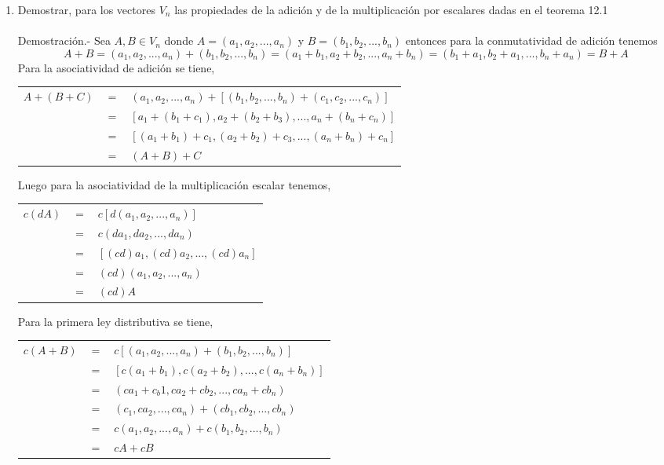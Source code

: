 \begin{enumerate}[\bfseries 1.]
\begin{enumerate}[\bfseries a)]
    \item Demostrar, para los vectores $V_n$ las propiedades de la adición y de la multiplicación por escalares dadas en el teorema 12.1\\\\
	Demostración.-\; Sea $A,B \in V_n$ donde $A=(a_1,a_2,...,a_n)$ y $B=(b_1,b_2,...,b_n)$ entonces para la conmutatividad de adición tenemos $$A+B=(a_1,a_2,...,a_n)+(b_1,b_2,...,b_n) = (a_1+b_1,a_2+b_2,...,a_n+b_n) = (b_1+a_1,b_2+a_1,...,b_n+a_n) = B+A$$
	Para la asociatividad de adición se tiene,
	\begin{center}
	    \begin{tabular}{rcl}
		$A+(B+C)$&$=$&$(a_1,a_2,...,a_n)+\left[(b_1,b_2,...,b_n)+(c_1,c_2,...,c_n)\right]$\\
		&$=$&$\left[a_1+(b_1+c_1),a_2+(b_2+b_3),...,a_n+(b_n+c_n)\right]$\\
		&$=$&$\left[(a_1+b_1)+c_1,(a_2+b_2)+c_3,...,(a_n+b_n)+c_n\right]$\\
		&$=$&$(A+B)+C$\\
	    \end{tabular}
	\end{center}
	Luego para la asociatividad de la multiplicación escalar tenemos,
	\begin{center}
	    \begin{tabular}{rcl}
		$c(dA)$&$=$&$c\left[d(a_1,a_2,...,a_n)\right]$\\
		&$=$&$c(da_1,da_2,...,da_n)$\\
		&$=$&$\left[(cd)a_1,(cd)a_2,...,(cd)a_n\right]$\\
		&$=$&$(cd)(a_1,a_2,...,a_n)$\\
		&$=$&$(cd)A$\\
	    \end{tabular}
	\end{center}
	Para la primera ley distributiva se tiene,
	\begin{center}
	    \begin{tabular}{rcl}
		$c(A+B)$&$=$&$c\left[(a_1,a_2,...,a_n)+(b_1,b_2,...,b_n)\right]$\\
		&$=$&$\left[c(a_1+b_1),c(a_2+b_2),...,c(a_n+b_n)\right]$\\
		&$=$&$(ca_1+c_b1,ca_2+cb_2,...,ca_n+cb_n)$\\
		&$=$&$(c_1,ca_2,...,ca_n)+(cb_1,cb_2,...,cb_n)$\\
		&$=$&$c(a_1,a_2,...,a_n)+c(b_1,b_2,...,b_n)$\\
		&$=$&$cA+cB$\\

\end{tabular}
\end{center}
\end{enumerate}
\end{enumerate}
